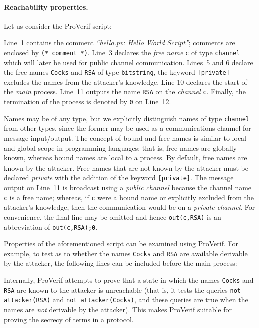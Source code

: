 \documentclass{book}
\newcommand{\tblue}[1]{\textcolor{blue}{REMARK: \emph{#1}}}
\renewcommand{\marginpar}[1]{\tblue{#1}}
\begin{document}
\paragraph{Reachability properties.} Let us consider the ProVerif script:
%

%
Line~1 contains the comment \emph{``hello.pv: Hello World Script''}; comments are enclosed by \lstinline!(* comment *)!. Line~3 declares the \emph{free name} \lstinline!c! of type \lstinline!channel! which will later be used for public channel communication. Lines~5 and 6 declare the free names \lstinline!Cocks! and \lstinline!RSA! of type \lstinline!bitstring!, the keyword \lstinline![private]! excludes the names from the attacker's knowledge. Line 10 declares the start of the \emph{main} process. Line~11 outputs the name \lstinline!RSA! on the \emph{channel} \lstinline!c!. Finally, the termination of the process is denoted by \lstinline!0! on Line~12.

Names may be of any type, but we explicitly distinguish names of type \lstinline!channel! from other types, since the former may be used as a communications channel for message input/output. The concept of bound and free names is similar to local and global scope in programming languages; that is, free names are globally known, whereas bound names are local to a process. By default, free names are known by the attacker. Free names that are not known by the attacker must be declared \emph{private} with the addition of the keyword \lstinline![private]!. The message output on Line~11 is broadcast using a \emph{public channel} because the channel name \lstinline!c! is a free name; whereas, if \lstinline!c! were a bound name or explicitly excluded from the attacker's knowledge, then the communication would be on a \emph{private channel}. For convenience, the final line may be omitted and hence \lstinline!out(c,RSA)! is an abbreviation of \lstinline!out(c,RSA);0!.

Properties of the aforementioned script can be examined using ProVerif. For example, to test as to whether the names \lstinline!Cocks! and \lstinline!RSA! are available derivable by the attacker, the following lines can be included before the main process:
%

%
Internally, ProVerif attempts to prove that a state in which the names \lstinline!Cocks! and \lstinline!RSA! are known to the attacker is unreachable (that is, it tests the queries \lstinline!not attacker(RSA)! and \lstinline!not attacker(Cocks)!, and these queries are true when the names are \emph{not} derivable by the attacker). This makes ProVerif suitable for proving the secrecy of terms in a protocol.
\end{document}
